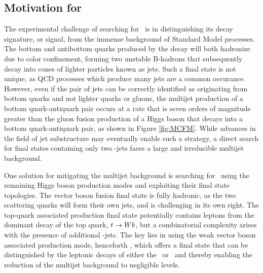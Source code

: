 \subsection{Motivation for \VHbb}

The experimental challenge of searching for \Hbb\ is in distinguishing its decay signature, or signal, from the immense background of Standard Model processes. The bottom and antibottom quarks produced by the decay will both hadronize due to color confinement, forming two unstable B-hadrons that subsequently decay into cones of lighter particles known as jets. Such a final state is not unique, as QCD processes which produce many jets are a common occurance. However, even if the pair of jets can be correctly identified as originating from bottom quarks and not lighter quarks or gluons, the multijet production of a bottom quark-antiquark pair occurs at a rate that is seven orders of magnitude greater than the gluon fusion production of a Higgs boson that decays into a bottom quark-antiquark pair, as shown in Figure \ref{fig:MCFM}. While advances in the field of jet substructure may eventually enable such a strategy\cite{ggHbb}, a direct search for final states containing only two \qrkb-jets faces a large and irreducible multijet background.

One solution for mitigating the multijet background is searching for \Hbb\ using the remaining Higgs boson production modes and exploiting their final state topologies. The vector boson fusion final state is fully hadronic, as the two scattering quarks will form their own jets, and is challenging in its own right. The top-quark associated production final state potentially contains leptons from the dominant decay of the top quark, $t \rightarrow Wb$, but a combinatorial complexity arises with the presence of additional \qrkb-jets. The key lies in using the weak vector boson associated production mode, henceforth \VHbb, which offers a final state that can be distinguished by the leptonic decays of either the \bosW\ or \bosZ\ and thereby enabling the reduction of the multijet background to negligible levels.

